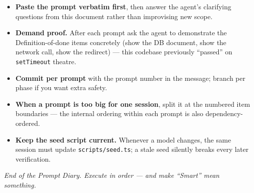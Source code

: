 \documentclass[11pt,a4paper]{article}
\newcommand{\filepath}[1]{\texttt{#1}}
\begin{document}
\begin{itemize}[leftmargin=1.6em]
  \item \textbf{Paste the prompt verbatim first}, then answer the agent's clarifying
        questions from this document rather than improvising new scope.
  \item \textbf{Demand proof.} After each prompt ask the agent to demonstrate the
        Definition-of-done items concretely (show the DB document, show the network
        call, show the redirect) --- this codebase previously ``passed'' on
        \texttt{setTimeout} theatre.
  \item \textbf{Commit per prompt} with the prompt number in the message; branch per
        phase if you want extra safety.
  \item \textbf{When a prompt is too big for one session}, split it at the numbered
        item boundaries --- the internal ordering within each prompt is also
        dependency-ordered.
  \item \textbf{Keep the seed script current.} Whenever a model changes, the same
        session must update \filepath{scripts/seed.ts}; a stale seed silently breaks
        every later verification.
\end{itemize}

\vspace{1cm}
\begin{center}
  \color{phasegray}\itshape
  End of the Prompt Diary. Execute in order --- and make ``Smart'' mean something.
\end{center}
\end{document}
